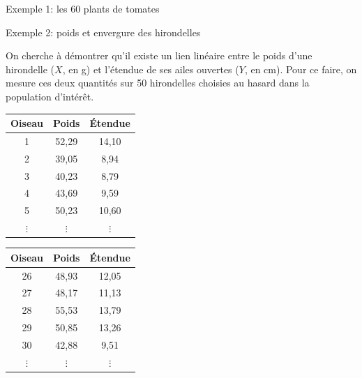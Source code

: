 \documentclass{BeamerTemplate}
\begin{document}
\begin{frame}[t]{Exemple 1: les 60 plants de tomates}

\begin{center}
\end{center}


\end{frame}

\begin{frame}[t]{Exemple 2: poids et envergure des hirondelles}

On cherche à démontrer qu'il existe un lien linéaire entre le \alert{poids}
d'une hirondelle ($X$, en g) et l'\alert{étendue de ses ailes} ouvertes ($Y$, en cm).
Pour ce faire, on mesure ces deux quantités sur 50 hirondelles choisies au
hasard dans la population d'intérêt.

\medskip
\begin{center}
\scriptsize
\begin{tabular}{ccc}
\toprule
Oiseau & Poids & Étendue\\
\midrule
1 & 52,29 & 14,10\\
2 & 39,05 & 8,94\\
3 & 40,23 & 8,79\\
4 & 43,69 & 9,59\\
5 & 50,23 & 10,60\\
$\vdots$ & $\vdots$ & $\vdots$\\
\bottomrule
\end{tabular}
\hspace{1cm}
\begin{tabular}{ccc}
\toprule
Oiseau & Poids & Étendue\\
\midrule
26 & 48,93 & 12,05\\
27 & 48,17 & 11,13\\
28 & 55,53 & 13,79\\
29 & 50,85 & 13,26\\
30 & 42,88 & 9,51\\
$\vdots$ & $\vdots$ & $\vdots$\\
\bottomrule
\end{tabular}
\end{center}

\end{frame}
\end{document}
